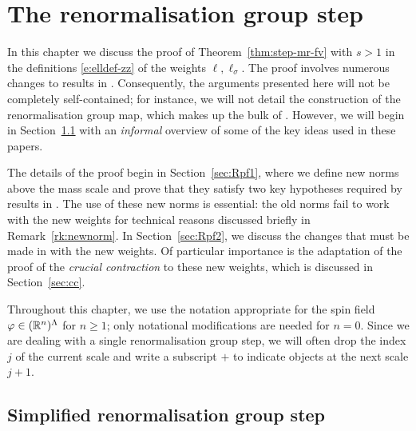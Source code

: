 \chapter{The renormalisation group step}
\label{sec:RGstep}

\renewcommand{\Vpt}{\Vp_\pt}

In this chapter we discuss the proof of Theorem~\ref{thm:step-mr-fv}
with $s > 1$ in the definitions \eqref{e:elldef-zz} of the weights
$\ell, \ell_\sigma$. The proof involves numerous changes
to results in \cite{BS-rg-loc,BS-rg-IE,BS-rg-step}.
Consequently, the arguments presented here will not be completely self-contained;
for instance, we will not detail the construction of the renormalisation group
map, which makes up the bulk of \cite{BS-rg-step}.
However, we will begin in Section~\ref{sec:rgmech} with an \emph{informal} overview
of some of the key ideas used in these papers.

The details of the proof begin in Section~\ref{sec:Rpf1}, where we define new
norms above the mass scale and prove that they satisfy two key hypotheses required
by results in \cite{BS-rg-IE}. The use of these new norms is essential: the old
norms fail to work with the new weights for technical reasons discussed briefly
in Remark~\ref{rk:newnorm}. In Section~\ref{sec:Rpf2}, we discuss the changes that
must be made in \cite{BS-rg-loc,BS-rg-IE} with the new weights. Of particular
importance is the adaptation of the proof of the \emph{crucial contraction} to
these new weights, which is discussed in Section~\ref{sec:cc}.

Throughout this chapter, we use the notation appropriate for the spin field
$\varphi \in ({\mathbb R}^n)^\Lambda$ for $n \ge 1$; only notational modifications are
needed for $n=0$.
Since we are dealing with a single renormalisation group step, we will often
drop the index $j$ of the current scale and write a subscript $+$ to indicate
objects at the next scale $j + 1$.


\section{Simplified renormalisation group step}
\label{sec:rgmech}

